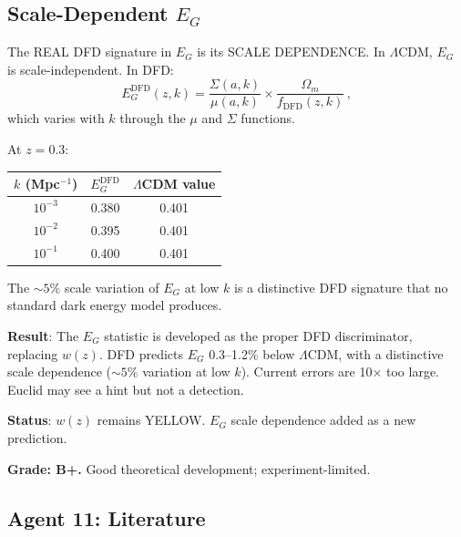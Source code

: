 \documentclass[11pt,a4paper]{article}
\begin{document}
\subsection{Scale-Dependent $E_G$}

The REAL DFD signature in $E_G$ is its SCALE DEPENDENCE. In $\Lambda$CDM, $E_G$ is scale-independent. In DFD:
\begin{equation}
E_G^{\mathrm{DFD}}(z, k) = \frac{\Sigma(a,k)}{\mu(a,k)} \times \frac{\Omega_m}{f_{\mathrm{DFD}}(z,k)}\,,
\end{equation}
which varies with $k$ through the $\mu$ and $\Sigma$ functions.

At $z = 0.3$:
\begin{center}
\begin{tabular}{ccc}
\toprule
$k$ (Mpc$^{-1}$) & $E_G^{\mathrm{DFD}}$ & $\Lambda$CDM value \\
\midrule
$10^{-3}$ & 0.380 & 0.401 \\
$10^{-2}$ & 0.395 & 0.401 \\
$10^{-1}$ & 0.400 & 0.401 \\
\bottomrule
\end{tabular}
\end{center}

The $\sim 5\%$ scale variation of $E_G$ at low $k$ is a distinctive DFD signature that no standard dark energy model produces.

\begin{tcolorbox}[colback=yellow!5!white, colframe=yellow!60!black, title={Agent 11: $w(z)$ YELLOW --- $E_G$ Alternative Developed}]
\textbf{Result}: The $E_G$ statistic is developed as the proper DFD discriminator, replacing $w(z)$. DFD predicts $E_G$ 0.3--1.2\% below $\Lambda$CDM, with a distinctive scale dependence ($\sim 5\%$ variation at low $k$). Current errors are 10$\times$ too large. Euclid may see a hint but not a detection.

\textbf{Status}: $w(z)$ remains YELLOW. $E_G$ scale dependence added as a new prediction.

\textbf{Grade: B+.} Good theoretical development; experiment-limited.
\end{tcolorbox}

\subsection{Agent 11: Literature}
\end{document}

